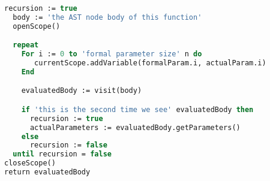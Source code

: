 \begin{lstlisting}[language=Pascal,label=alg:tailrecursion, caption={\emph{Detecting tail recursion during call of a function.}}]
  recursion := true 
  body := 'the AST node body of this function'
  openScope()

  repeat
    For i := 0 to 'formal parameter size' n do
       currentScope.addVariable(formalParam.i, actualParam.i)
    End

    evaluatedBody := visit(body)

    if 'this is the second time we see' evaluatedBody then
      recursion := true
      actualParameters := evaluatedBody.getParameters()
    else
      recursion := false
  until recursion = false 
closeScope()
return evaluatedBody
\end{lstlisting}

%
%  
%  
